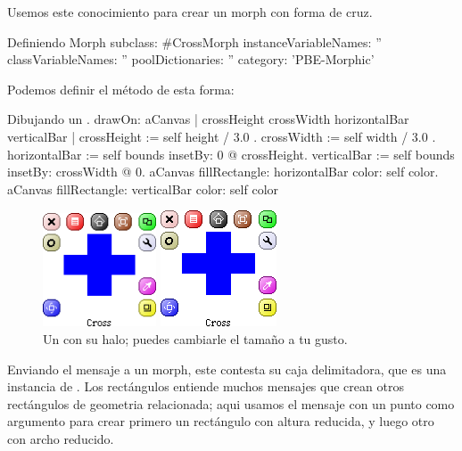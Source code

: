 \documentclass[a4paper,10pt,twoside]{book}
\begin{document}
Usemos este conocimiento para crear un morph con forma de cruz.

\begin{classdef}{Definiendo }
Morph subclass: #CrossMorph
	instanceVariableNames: ''
	classVariableNames: ''
	poolDictionaries: ''
	category: 'PBE-Morphic'
\end{classdef}

Podemos definir el m\'etodo  de esta forma:
\begin{method}[firstDrawOn]{Dibujando un .}
drawOn: aCanvas 
	| crossHeight crossWidth horizontalBar verticalBar |
	crossHeight := self height / 3.0 .
	crossWidth := self width / 3.0 .
	horizontalBar := self bounds insetBy: 0 @ crossHeight.
	verticalBar := self bounds insetBy: crossWidth @ 0.
	aCanvas fillRectangle: horizontalBar color: self color.
	aCanvas fillRectangle: verticalBar color: self color
\end{method}


\begin{figure}[hbt]
	\ifluluelse
		{\centerline{\includegraphics[width=0.3\textwidth]{NewCross}}}
		{\centerline{\includegraphics{NewCross}}}
	\caption{Un  con su halo; puedes cambiarle el tama\~no a tu gusto.
		}
\end{figure}


Enviando el mensaje  a un morph, este contesta su caja delimitadora, que es una instancia de .  Los rect\'angulos entiende muchos mensajes que crean otros rect\'angulos de geometria relacionada; aqui usamos el mensaje  con un punto como argumento para crear primero un  rect\'angulo con altura reducida, y luego otro con archo reducido.
\end{document}
